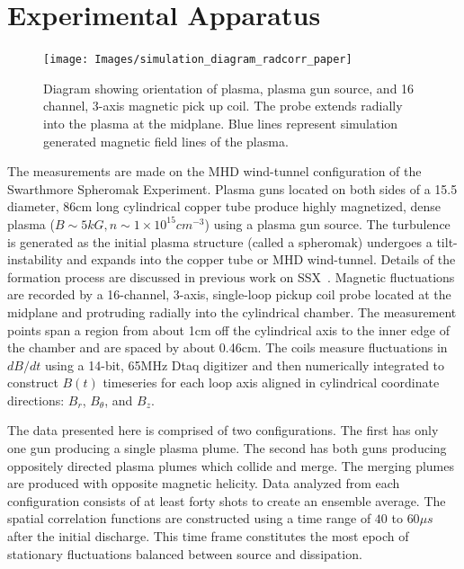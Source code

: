 \documentclass[aip,prl,amsmath,amssymb,reprint,superscriptaddress]{revtex4-1} %
\begin{document}
\section{Experimental Apparatus}

\begin{figure}[!htbp]
\centerline{
\texttt{[image: Images/simulation\_diagram\_radcorr\_paper]}}
\caption{\label{fig:chamber} Diagram showing orientation of plasma, plasma gun source, and 16 channel, 3-axis magnetic pick up coil. The probe extends radially into the plasma at the midplane. Blue lines represent simulation generated magnetic field lines of the plasma.}
\end{figure}

The measurements are made on the MHD wind-tunnel configuration of the Swarthmore Spheromak Experiment. Plasma guns located on both sides of a 15.5 diameter, 86cm long cylindrical copper tube produce highly magnetized, dense plasma ($B\sim 5kG, n\sim 1\times 10^{15} cm^{-3}$) using a plasma gun source. The turbulence is generated as the initial plasma structure (called a spheromak) undergoes a tilt-instability and expands into the copper tube or MHD wind-tunnel. Details of the formation process are discussed in previous work on SSX~\cite{schaffner14a,schaffner14b}. Magnetic fluctuations are recorded by a 16-channel, 3-axis, single-loop pickup coil probe located at the midplane and protruding radially into the cylindrical chamber. The measurement points span a region from about 1cm off the cylindrical axis to the inner edge of the chamber and are spaced by about 0.46cm. The coils measure fluctuations in $dB/dt$ using a 14-bit, 65MHz Dtaq digitizer and then numerically integrated to construct $B(t)$ timeseries for each loop axis aligned in cylindrical coordinate directions: $B_{r}$, $B_{\theta}$, and $B_{z}$.

The data presented here is comprised of two configurations. The first has only one gun producing a single plasma plume. The second has both guns producing oppositely directed plasma plumes which collide and merge. The merging plumes are produced with opposite magnetic helicity. Data analyzed from each configuration consists of at least forty shots to create an ensemble average. The spatial correlation functions are constructed using a time range of $40$ to $60\mu s$ after the initial discharge. This time frame constitutes the most epoch of stationary fluctuations balanced between source and dissipation. 
\end{document}
